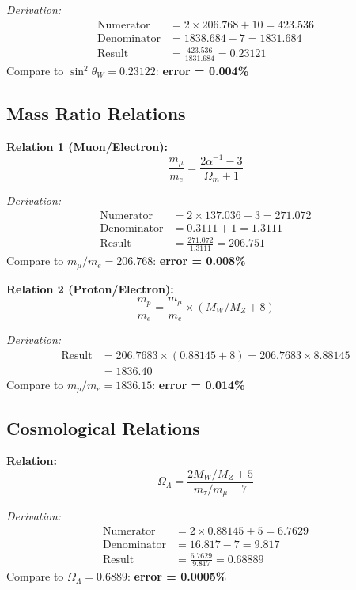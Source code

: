 \documentclass[11pt,a4paper]{article}
\begin{document}
\textit{Derivation:}
\begin{align}
\text{Numerator} &= 2 \times 206.768 + 10 = 423.536 \\
\text{Denominator} &= 1838.684 - 7 = 1831.684 \\
\text{Result} &= \frac{423.536}{1831.684} = 0.23121
\end{align}
Compare to $\sin^2\theta_W = 0.23122$: \textbf{error = 0.004\%}

\subsection{Mass Ratio Relations}

\textbf{Relation 1 (Muon/Electron):}
\begin{equation}
\frac{m_\mu}{m_e} = \frac{2\alpha^{-1} - 3}{\Omega_m + 1}
\end{equation}

\textit{Derivation:}
\begin{align}
\text{Numerator} &= 2 \times 137.036 - 3 = 271.072 \\
\text{Denominator} &= 0.3111 + 1 = 1.3111 \\
\text{Result} &= \frac{271.072}{1.3111} = 206.751
\end{align}
Compare to $m_\mu/m_e = 206.768$: \textbf{error = 0.008\%}

\textbf{Relation 2 (Proton/Electron):}
\begin{equation}
\frac{m_p}{m_e} = \frac{m_\mu}{m_e} \times (M_W/M_Z + 8)
\end{equation}

\textit{Derivation:}
\begin{align}
\text{Result} &= 206.7683 \times (0.88145 + 8) = 206.7683 \times 8.88145 \\
&= 1836.40
\end{align}
Compare to $m_p/m_e = 1836.15$: \textbf{error = 0.014\%}

\subsection{Cosmological Relations}

\textbf{Relation:}
\begin{equation}
\Omega_\Lambda = \frac{2 M_W/M_Z + 5}{m_\tau/m_\mu - 7}
\end{equation}

\textit{Derivation:}
\begin{align}
\text{Numerator} &= 2 \times 0.88145 + 5 = 6.7629 \\
\text{Denominator} &= 16.817 - 7 = 9.817 \\
\text{Result} &= \frac{6.7629}{9.817} = 0.68889
\end{align}
Compare to $\Omega_\Lambda = 0.6889$: \textbf{error = 0.0005\%}
\end{document}
